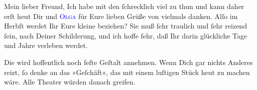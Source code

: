 \pstart{}Mein lieber Freund,\pend
\pstart
           Ich habe mit den \label{K_L03375-13v}\label{K_L03375-13h} ſchrecklich viel zu thun und kann daher erſt heut Dir und \textsc{\textcolor{blue}{Olga}{}\ledrightnote{\textcolor{blue}{Olga Schnitzler}}} für Eure lieben Grüße von \label{K_L03375-1v}\label{K_L03375-1h} vielmals danken. Alſo im Herbſt werdet Ihr Eure kleine \label{K_L03375-2v}\label{K_L03375-2h} beziehen? Sie muß ſehr
               traulich und ſehr reizend ſein, nach Deiner Schilderung, und ich hoffe ſehr, daß Ihr
               darin glückliche Tage und Jahre verleben werdet.\pend
           
\pstart
           Die \label{K_L03375-3v}\label{K_L03375-3h} wird
               hoffentlich noch feſte Geſtalt annehmen. {\pb}Wenn Dich
               gar nichts Anderes reizt, ſo denke an das »Geſchäft«, das mit einem luſtigen Stück
               heut zu machen wäre. Alle Theater würden danach greifen.\pend
           
